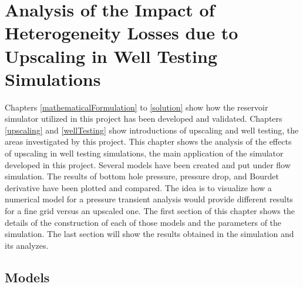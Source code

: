 \chapter{Analysis of the Impact of Heterogeneity Losses due to Upscaling in Well Testing Simulations}
\label{chapterResults}

Chapters \ref{mathematicalFormulation} to \ref{solution} show how the reservoir simulator utilized in this project has been developed and validated. Chapters \ref{upscaling} and \ref{wellTesting} show introductions of upscaling and well testing, the areas investigated by this project. This chapter shows the analysis of the effects of upscaling in well testing simulations, the main application of the simulator developed in this project. Several models have been created and put under flow simulation. The results of bottom hole pressure, pressure drop, and Bourdet derivative have been plotted and compared. The idea is to visualize how a numerical model for a pressure transient analysis would provide different results for a fine grid versus an upscaled one. The first section of this chapter shows the details of the construction of each of those models and the parameters of the simulation. The last section will show the results obtained in the simulation and its analyzes.

\section{Models}

